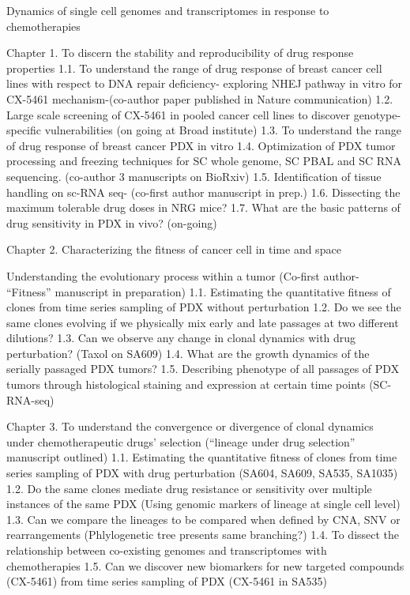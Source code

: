 Dynamics of single cell genomes and transcriptomes in response to chemotherapies

Chapter 1. To discern the stability and reproducibility of drug response properties  
1.1. To understand the range of drug response of breast cancer cell lines with respect to DNA repair deficiency- exploring NHEJ pathway in vitro for CX-5461 mechanism-(co-author paper published in Nature communication)
1.2. Large scale screening of CX-5461 in pooled cancer cell lines to discover genotype-specific vulnerabilities (on going at Broad institute)
1.3. To understand the range of drug response of breast cancer PDX in vitro
1.4. Optimization of PDX tumor processing and freezing techniques for SC whole genome, SC PBAL and SC RNA sequencing. (co-author 3 manuscripts on BioRxiv) 
1.5. Identification of tissue handling on sc-RNA seq- (co-first author manuscript in prep.)
1.6. Dissecting the maximum tolerable drug doses in NRG mice?
1.7. What are the basic patterns of drug sensitivity in PDX in vivo? (on-going)

Chapter 2. Characterizing the fitness of cancer cell in time and space

Understanding the evolutionary process within a tumor (Co-first author- “Fitness” manuscript in preparation)
1.1. Estimating the quantitative fitness of clones from time series sampling of PDX without perturbation
1.2. Do we see the same clones evolving if we physically mix early and late passages at two different dilutions?
1.3. Can we observe any change in clonal dynamics with drug perturbation? (Taxol on SA609)
1.4. What are the growth dynamics of the serially passaged PDX tumors?
1.5. Describing phenotype of all passages of PDX tumors through histological staining and expression at certain time points (SC-RNA-seq) 

Chapter 3. To understand the convergence or divergence of clonal dynamics under chemotherapeutic drugs’ selection (“lineage under drug selection” manuscript outlined)
1.1. Estimating the quantitative fitness of clones from time series sampling of PDX with drug perturbation (SA604, SA609, SA535, SA1035)
1.2.  Do the same clones mediate drug resistance or sensitivity over multiple instances of the same PDX (Using genomic markers of lineage at single cell level)
1.3. Can we compare the lineages to be compared when defined by CNA, SNV or rearrangements (Phlylogenetic tree presents same branching?) 	
1.4. To dissect the relationship between co-existing genomes and transcriptomes with chemotherapies
1.5. Can we discover new biomarkers for new targeted compounds (CX-5461) from time series sampling of PDX (CX-5461 in SA535) 

